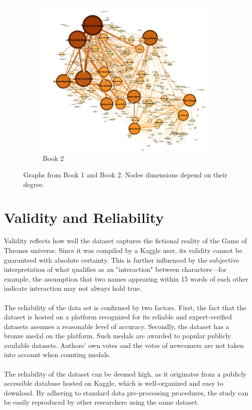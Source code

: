 \documentclass[12pt, a4paper]{article}
\begin{document}
\begin{figure}[H]
\begin{subfigure}{.5\textwidth}
  \includegraphics[width=1\linewidth]{book_2.png}
  \caption{Book 2}
  \label{fig:sub2}
\end{subfigure}
\caption{Graphs from Book 1 and Book 2. Nodes dimensions depend on their degree.}
\label{fig:test}
\end{figure}

\section{Validity and Reliability}
\label{validity-and-reliability-not-needed-for-the-project-proposal}
Validity reflects how well the dataset captures the fictional reality of the Game of Thrones universe. Since it was compiled by a Kaggle user, its validity cannot be guaranteed with absolute certainty. This is further influenced by the subjective interpretation of what qualifies as an "interaction" between characters—for example, the assumption that two names appearing within 15 words of each other indicate interaction may not always hold true.
\\\\The reliability of the data set is confirmed by two factors. First, the fact that the dataset is hosted on a platform recognized for its reliable and expert-verified datasets assumes a reasonable level of accuracy. Secondly, the dataset has a bronze medal on the platform. Such medals are awarded to popular publicly available datasets. Authors' own votes and the votes of newcomers are not taken into account when counting medals.
\\\\The reliability of the dataset can be deemed high, as it originates from a publicly accessible database hosted on Kaggle, which is well-organized and easy to download. By adhering to standard data pre-processing procedures, the study can be easily reproduced by other researchers using the same dataset.
\end{document}
